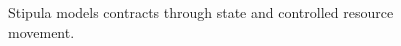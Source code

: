 \begin{figure}[H]
\centering
{}
\caption{Stipula models contracts through state and controlled resource movement.}\label{fig:teach-M04-05}
\end{figure}
